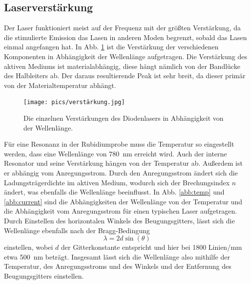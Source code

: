 \subsection{Laserverstärkung}

Der Laser funktioniert meist auf der Frequenz mit der größten Verstärkung, da die stimulierte Emission das Lasen in anderen Moden begrenzt, sobald das Lasen einmal angefangen hat.
In Abb. \ref{abb:verstärker} ist die Verstärkung der verschiedenen Komponenten in Abhängigkeit der Wellenlänge aufgetragen. Die Verstärkung des aktiven Mediums ist materialabhängig, diese hängt nämlich von der Bandlücke des Halbleiters ab. Der daraus resultierende Peak ist sehr breit, da dieser primär von der Materialtemperatur abhängt.

\begin{figure}
    \centering
    \texttt{[image: pics/verstärkung.jpg]}
    \caption{Die einzelnen Verstärkungen des Diodenlasers in Abhängigkeit von der Wellenlänge. \cite{anleitung}}
    \label{abb:verstärker}
\end{figure}

Für eine Resonanz in der Rubidiumprobe muss die Temperatur so eingestellt werden, dass eine Wellenlänge von \SI{780}{\nm} erreicht wird. Auch der interne Resonator und seine Verstärkung hängen von der Temperatur ab. Außerdem ist er abhängig vom Anregungsstrom. Durch den Anregungsstrom ändert sich die Ladungsträgerdichte im aktiven Medium, wodurch sich der Brechungsindex $n$ ändert, was ebenfalls die Wellenlänge beeinflusst. In Abb. \ref{abb:temp} und \ref{abb:current} sind die Abhängigkeiten der Wellenlänge von der Temperatur und die Abhängigkeit vom Anregungsstrom für einen typischen Laser aufgetragen. Durch Einstellen des horizontalen Winkels des Beugungsgitters, lässt sich die Wellenlänge ebenfalls  nach der Bragg-Bedingung
\begin{equation*}
    \lambda = 2d \sin(\theta)
\end{equation*}
einstellen, wobei $d$ der Gitterkonstante entspricht und hier bei 1800 Linien/\si{\mm} etwa \SI{500}{\nm} beträgt. Insgesamt lässt sich die Wellenlänge also mithilfe der Temperatur, des Anregungsstroms und des Winkels und der Entfernung des Beugungsgitters einstellen.

